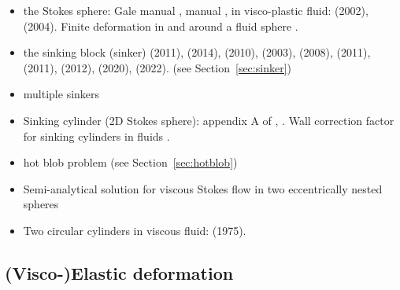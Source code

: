 \begin{itemize}
\item the Stokes sphere: Gale manual \cite{galemanual}, 
      \aspect{} manual \cite{aspectmanual}, 
      in visco-plastic fluid: \textcite{limd02} (2002), 
      \textcite{demj04} (2004). 
      Finite deformation in and around a fluid sphere \cite{sccm88,crud88}.

\item the sinking block (sinker) 
      \textcite{thie11} (2011),
      \textcite{cehg14} (2014),
      \textcite{gery10} (2010),
      \textcite{geyu03} (2003),
      \textcite{mamo08} (2008),
      \textcite{mishin11} (2011),
      \textcite{fumt11} (2011),
      \textcite{maie12} (2012),
      \textcite{sctc20} (2020),
      \textcite{mivg22} (2022). 
      (see Section~\ref{sec:sinker})

\item multiple sinkers \cite{mabl14,mabl15,clhe21,rusg17}

\item Sinking cylinder (2D Stokes sphere): 
      appendix A of \cite{boht08a}, \cite{wali04}.
      Wall correction factor for sinking cylinders in fluids \cite{rist97}.

\item hot blob problem \cite{bugs09,fumt11} (see Section~\ref{sec:hotblob})

\item Semi-analytical solution for viscous Stokes flow in two eccentrically
nested spheres \cite{toma07}

\item Two circular cylinders in viscous fluid: \textcite{waki75a,waki75b} (1975).

\end{itemize}


\subsection{(Visco-)Elastic deformation}

